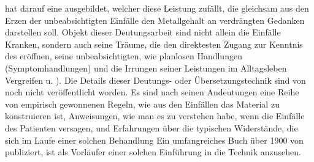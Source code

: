 \documentclass[twoside=true,titlepage=false,open=any, parskip=never, fontsize=10pt, headings=small, chapterprefix=false, appendixprefix=false]{scrbook}
\begin{document}
            
        \pstart
         hat darauf eine  ausgebildet,
               welcher diese Leistung zufällt, die gleichsam aus den Erzen der unbeabsichtigten Einfälle den Metallgehalt an verdrängten Gedanken
               darstellen soll. Objekt dieser Deutungsarbeit sind nicht allein die Einfälle  Kranken, sondern auch seine Träume,
               die den direktesten Zugang zur Kenntnis des  eröffnen, seine unbeabsichtigten, wie planlosen Handlungen
               (Symptomhandlungen) und die Irrungen seiner Leistungen im Alltagsleben 
               Vergreifen u. ). Die Details dieser Deutungs- oder Übersetzungstechnik sind
               von  noch nicht veröffentlicht worden. Es sind nach seinen Andeutungen eine Reihe von
               empirisch gewonnenen Regeln, wie aus den Einfällen das  Material zu konstruieren ist, Anweisungen, wie man es zu verstehen
               habe, wenn die Einfälle des Patienten versagen, und Erfahrungen über die  typischen Widerstände, die sich im Laufe einer solchen Behandlung  Ein umfangreiches Buch über 1900 von  publiziert, ist als
               Vorläufer einer solchen Einführung in die Technik anzusehen.
        \pend
    
\end{document}
